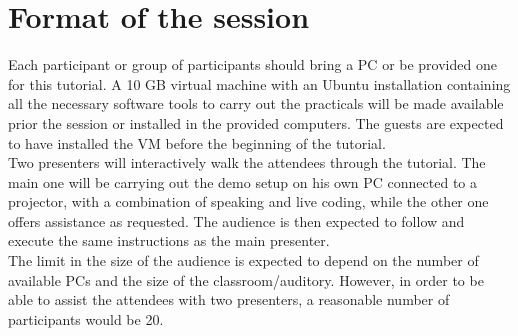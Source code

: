\documentclass[
10pt, %
a4paper, %
oneside, %
BCOR5mm, %
]{scrartcl}
\begin{document}
\section{Format of the session}
\label{sec:format}
Each participant or group of participants should bring a PC or be provided one for this tutorial.
A 10 GB virtual machine with an Ubuntu installation containing all the necessary software tools to carry out the practicals will be made available prior the session or installed in the provided computers. 
The guests are expected to have installed the VM before the beginning of the tutorial.
\\
Two presenters will interactively walk the attendees through the tutorial. 
The main one will be carrying out the demo setup on his own PC connected to a projector, with a combination of speaking and live coding, while the other one offers assistance as requested. 
The audience is then expected to follow and execute the same instructions as the main presenter.
\\ 
The limit in the size of the audience is expected to depend on the number of available PCs and the size of the classroom/auditory.
However, in order to be able to assist the attendees with two presenters, a reasonable number of participants would be 20.


\renewcommand{\refname}{\spacedlowsmallcaps{References}} %

% 




\end{document}
